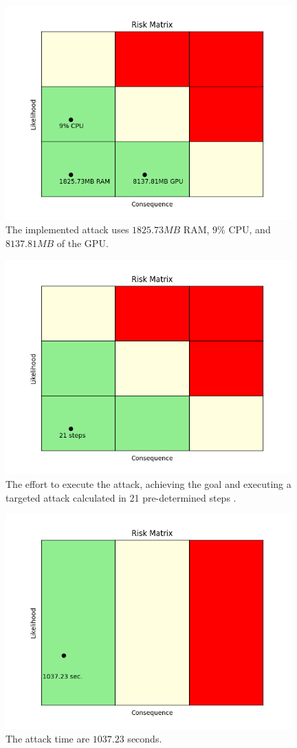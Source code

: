 \begin{figure}[ht!]
  \centering
  \includegraphics[width=11cm]{pictures/attack_resources.png}
  \caption{The implemented attack uses $1825.73MB$ RAM, $9\%$ CPU, and $8137.81MB$ of the GPU.}
  \label{fig:resources}
\end{figure}

\begin{figure}[ht!]
  \centering
  \includegraphics[width=11cm]{pictures/attack_steps.png}
  \caption{The effort to execute the attack, achieving the goal and executing a targeted attack calculated in 21 pre-determined steps \cite{bsi_2013}.}
  \label{fig:attack_steps}
\end{figure}

\begin{figure}[ht!]
  \centering
  \includegraphics[width=11cm]{pictures/attack_time.png}
  \caption{The attack time are $1037.23$ seconds.}
  \label{fig:attack_time}
\end{figure}

